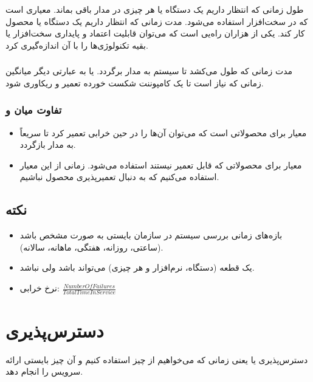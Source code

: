 \documentclass[a4paper]{article}
\begin{document}
طول زمانی که انتظار داریم یک دستگاه یا هر چیزی در مدار باقی بماند. 
معیاری است که در سخت‌افزار استفاده می‌شود. مدت زمانی که انتظار داریم یک دستگاه
یا محصول کار کند.  یکی از هزاران راه‌یی است که می‌توان قابلیت اعتماد و
پایداری سخت‌افزار یا بقیه تکنولوژی‌ها را با آن اندازه‌گیری کرد.

\subsubsection{}

مدت زمانی که طول می‌کشد تا سیستم به مدار برگردد. یا به عبارتی دیگر میانگین زمانی
که نیاز است تا یک کامپوننت شکست خورده تعمیر و ریکاوری شود.

\subsubsection{تفاوت میان  و }

\begin{itemize}
    \item معیار  برای محصولاتی است که می‌توان آن‌ها را در حین خرابی
    تعمیر کرد تا سریعاً به مدار بازگردد.
    \item معیار  برای محصولاتی که قابل تعمیر نیستند استفاده می‌شود.
    زمانی از این معیار استفاده می‌کنیم که به دنبال تعمیرپذیری محصول نباشیم.
\end{itemize}

\subsection*{نکته}

\begin{itemize}
    \item بازه‌های زمانی بررسی سیستم در سازمان بایستی به صورت مشخص باشد (ساعتی،
    روزانه، هفتگی، ماهانه، سالانه).
    \item یک قطعه (دستگاه، نرم‌افزار و هر چیزی) می‌تواند  باشد ولی
     نباشد.
    \item نرخ خرابی: $\frac{Number Of Failures}{Total Time In Service}$
\end{itemize}

\section{دسترس‌پذیری}

دسترس‌پذیری یا   یعنی زمانی که می‌خواهیم از چیز استفاده کنیم و
آن چیز بایستی ارائه سرویس را انجام دهد.
\end{document}
